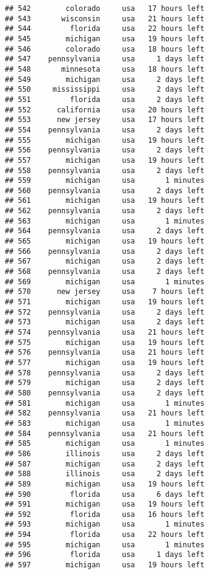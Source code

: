 \documentclass[
]{article}
\begin{document}
\begin{verbatim}
## 542        colorado     usa   17 hours left
## 543       wisconsin     usa   21 hours left
## 544         florida     usa   22 hours left
## 545        michigan     usa   19 hours left
## 546        colorado     usa   18 hours left
## 547    pennsylvania     usa     1 days left
## 548       minnesota     usa   18 hours left
## 549        michigan     usa     2 days left
## 550     mississippi     usa     2 days left
## 551         florida     usa     2 days left
## 552      california     usa   20 hours left
## 553      new jersey     usa   17 hours left
## 554    pennsylvania     usa     2 days left
## 555        michigan     usa   19 hours left
## 556    pennsylvania     usa     2 days left
## 557        michigan     usa   19 hours left
## 558    pennsylvania     usa     2 days left
## 559        michigan     usa       1 minutes
## 560    pennsylvania     usa     2 days left
## 561        michigan     usa   19 hours left
## 562    pennsylvania     usa     2 days left
## 563        michigan     usa       1 minutes
## 564    pennsylvania     usa     2 days left
## 565        michigan     usa   19 hours left
## 566    pennsylvania     usa     2 days left
## 567        michigan     usa     2 days left
## 568    pennsylvania     usa     2 days left
## 569        michigan     usa       1 minutes
## 570      new jersey     usa    7 hours left
## 571        michigan     usa   19 hours left
## 572    pennsylvania     usa     2 days left
## 573        michigan     usa     2 days left
## 574    pennsylvania     usa   21 hours left
## 575        michigan     usa   19 hours left
## 576    pennsylvania     usa   21 hours left
## 577        michigan     usa   19 hours left
## 578    pennsylvania     usa     2 days left
## 579        michigan     usa     2 days left
## 580    pennsylvania     usa     2 days left
## 581        michigan     usa       1 minutes
## 582    pennsylvania     usa   21 hours left
## 583        michigan     usa       1 minutes
## 584    pennsylvania     usa   21 hours left
## 585        michigan     usa       1 minutes
## 586        illinois     usa     2 days left
## 587        michigan     usa     2 days left
## 588        illinois     usa     2 days left
## 589        michigan     usa   19 hours left
## 590         florida     usa     6 days left
## 591        michigan     usa   19 hours left
## 592         florida     usa   16 hours left
## 593        michigan     usa       1 minutes
## 594         florida     usa   22 hours left
## 595        michigan     usa       1 minutes
## 596         florida     usa     1 days left
## 597        michigan     usa   19 hours left

\end{verbatim}
\end{document}
